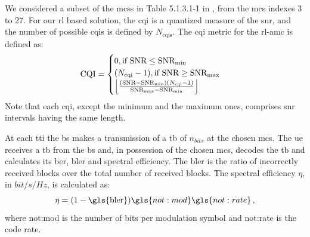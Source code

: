 We considered a subset of the \gls{mcs}s in Table 5.1.3.1-1 in \cite{3gpp.38.214}, from the \gls{mcs} indexes 3 to 27. For our \gls{rl} based solution, the \gls{cqi} is a quantized measure of the \gls{snr}, and the number of possible \gls{cqi}s is defined by $N_{\text{cqis}}$. The \gls{cqi} metric for the \gls{rl}-\gls{amc} is defined as:
\begin{equation}\label{eq:amc-cqi}
    \textrm{CQI} =
    \begin{cases}
    0, \text{if } \textrm{SNR} \leq \textrm{SNR}_{\text{min}}\\
    (N_{\text{cqi}}-1), \text{if } \textrm{SNR} \geq \textrm{SNR}_{\text{max}}\\
    \floor[\Big]{\frac{(\textrm{SNR} - \textrm{SNR}_{\text{min}})(N_{\text{cqi}}-1)}{\textrm{SNR}_{\text{max}}-\textrm{SNR}_{\text{min}}}}
    \end{cases}
\end{equation}
\noindent Note that each \gls{cqi}, except the minimum and the maximum ones, comprises \gls{snr} intervals having the same length.

At each \gls{tti} the \gls{bs} makes a transmission of a \gls{tb} of $n_{bits}$ at the chosen \gls{mcs}. The \gls{ue} receives a \gls{tb} from the \gls{bs} and, in possession of the chosen \gls{mcs}, decodes the \gls{tb} and calculates its \gls{ber}, \gls{bler} and spectral efficiency.
%
%
The \gls{bler} is the ratio of incorrectly received blocks over the total number of received blocks. %
%
The spectral efficiency $\eta$, in $bit/s/Hz$, is calculated as:
\begin{equation}
 \label{eq.:spec-eff}
 \eta = (1-\textrm{\gls{bler}})\gls{not:mod}\gls{not:rate} \, ,
\end{equation}
\noindent where \gls{not:mod} is the number of bits per modulation symbol and \gls{not:rate} is the code rate.

